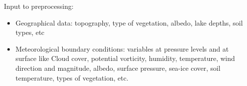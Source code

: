 \documentclass{beamer}
\begin{document}
\begin{frame}
\begin{center}
{
	}%
\end{center}
Input to preprocessing:
\begin{itemize}
	\item Geographical data: topography, type of vegetation, albedo, lake depths, soil types, etc
	\item Meteorological boundary conditions: variables at pressure levels and at surface like Cloud cover, potential vorticity, humidity, temperature, wind direction and magnitude, albedo, surface pressure, sea-ice cover, soil temperature, types of vegetation, etc.
\end{itemize}
\end{frame}
\end{document}
